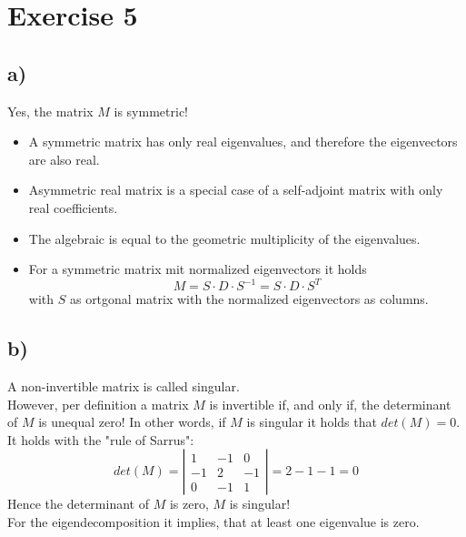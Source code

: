 \documentclass[a4paper]{article}
\begin{document}
\newpage
\section*{Exercise 5}
    \subsection*{a)}
        Yes, the matrix $M$ is symmetric!
        \begin{itemize}
            \item A symmetric matrix has only real eigenvalues, and therefore the eigenvectors are also real.
            \item Asymmetric real matrix is a special case of a self-adjoint matrix with only real coefficients.
            \item The algebraic is equal to the geometric multiplicity of the eigenvalues.
            \item For a symmetric matrix mit normalized eigenvectors it holds
                $$M = S \cdot D \cdot S^{-1} = S \cdot D \cdot S^T$$
                with $S$ as ortgonal matrix with the normalized eigenvectors as columns. 
        \end{itemize}
        
        
    \subsection*{b)}
        A non-invertible matrix is called singular.\\
        However, per definition a matrix $M$ is invertible if, and only if, the determinant of $M$ is unequal zero!
        In other words, if $M$ is singular it holds that $det(M)=0$.\\
        It holds with the "rule of Sarrus":
        $$det(M) = \left| \begin{matrix} 1 & -1 & 0 \\ -1 & 2 & -1 \\ 0 & -1 & 1 \end{matrix} \right| = 2 - 1 - 1 = 0$$
        Hence the determinant of $M$ is zero, $M$ is singular!\\
        For the eigendecomposition it implies, that at least one eigenvalue is zero.
        
        
\end{document}
